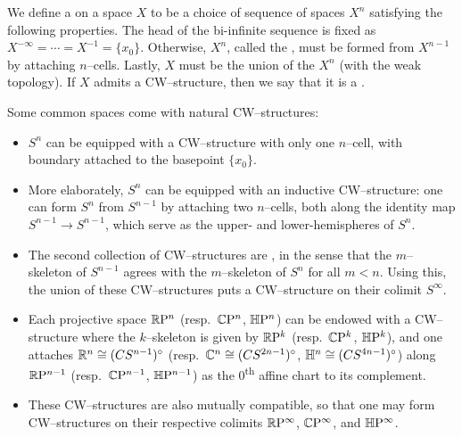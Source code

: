 \begin{definition}
We define a  on a space $X$ to be a choice of sequence of spaces $X^n$ satisfying the following properties.
The head of the bi-infinite sequence is fixed as $X^{-\infty} = \cdots = X^{-1} = \{x_0\}$.
Otherwise, $X^n$, called the , must be formed from $X^{n-1}$ by attaching $n$--cells.
Lastly, $X$ must be the union of the $X^n$ (with the weak topology).
If $X$ admits a CW--structure, then we say that it is a .
\end{definition}

\begin{example}\label{CommonCWEx}
Some common spaces come with natural CW--structures:
\begin{itemize}
    \item $S^n$ can be equipped with a CW--structure with only one $n$--cell, with boundary attached to the basepoint $\{x_0\}$.
    \item More elaborately, $S^n$ can be equipped with an inductive CW--structure: one can form $S^n$ from $S^{n-1}$ by attaching two $n$--cells, both along the identity map $S^{n-1} \to S^{n-1}$, which serve as the upper- and lower-hemispheres of $S^n$.
    \item The second collection of CW--structures are , in the sense that the $m$--skeleton of $S^{n-1}$ agrees with the $m$--skeleton of $S^n$ for all $m < n$.  Using this, the union of these CW--structures puts a CW--structure on their colimit $S^\infty$.
    \item Each projective space $\mathbb R \mathrm{P}^n$ (resp.\ $\mathbb C \mathrm{P}^n$, $\mathbb H \mathrm{P}^n$) can be endowed with a CW--structure where the $k$--skeleton is given by $\mathbb R \mathrm{P}^k$ (resp.\ $\mathbb C \mathrm{P}^k$, $\mathbb H \mathrm{P}^k$), and one attaches $\mathbb R^n \cong (CS^{n-1})^\circ$ (resp.\ $\mathbb C^n \cong (CS^{2n-1})^\circ$, $\mathbb H^n \cong (CS^{4n-1})^\circ$) along $\mathbb R \mathrm{P}^{n-1}$ (resp.\ $\mathbb C \mathrm{P}^{n-1}$, $\mathbb H \mathrm{P}^{n-1}$) as the $0$\textsuperscript{th} affine chart to its complement.
    \item These CW--structures are also mutually compatible, so that one may form CW--structures on their respective colimits $\mathbb R \mathrm{P}^\infty$, $\mathbb C \mathrm{P}^\infty$, and $\mathbb H \mathrm{P}^\infty$.
\end{itemize}
\end{example}

